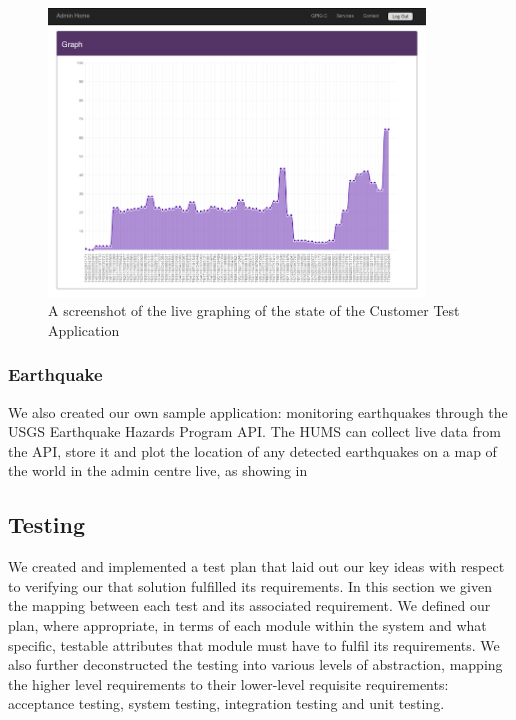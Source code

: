 \documentclass[10pt,a4paper]{article}
\begin{document}
\begin{figure}[htbp!]
  \centering
  \includegraphics[width=10cm]{images/graphing.png}
  \caption{A screenshot of the live graphing of the state of the Customer 
  Test Application}
  \label{fig:graphing}
\end{figure}

\subsubsection{Earthquake}
We also created our own sample application: monitoring earthquakes 
through the USGS Earthquake Hazards Program API. The HUMS
can collect live data from the API, store it and plot the location of any
detected earthquakes on a map of the world in the admin centre live,
as showing in %


\subsection{Testing} 
We created and implemented a test plan that laid out our key ideas
with respect to verifying our that solution fulfilled its
requirements. In this section we given the mapping between each
test and its associated requirement. We
defined our plan, where appropriate, in terms of each module within
the system and what specific, testable attributes that module must
have to fulfil its requirements. We also further deconstructed the
testing into various levels of abstraction, mapping the higher level
requirements to their lower-level requisite requirements: acceptance
testing, system testing, integration testing and unit
testing.
\end{document}

